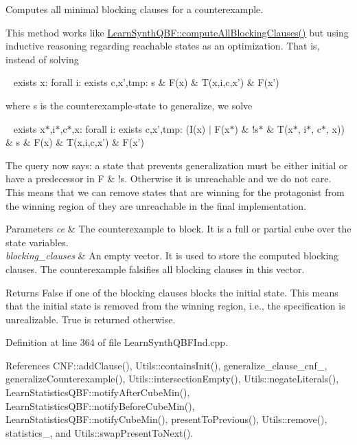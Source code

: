 Computes all minimal blocking clauses for a counterexample. 

This method works like \hyperlink{classLearnSynthQBF_affa7b4583cc17d01f4c82fd57e763e1f}{Learn\-Synth\-Q\-B\-F\-::compute\-All\-Blocking\-Clauses()} but using inductive reasoning regarding reachable states as an optimization. That is, instead of solving \par
 ~ exists x\-: forall i\-: exists c,x',tmp\-: s \& F(x) \& T(x,i,c,x') \& F(x') \par
 where s is the counterexample-\/state to generalize, we solve \par
 ~ exists x$\ast$,i$\ast$,c$\ast$,x\-: forall i\-: exists c,x',tmp\-: (I(x) $|$ F(x$\ast$) \& !s$\ast$ \& T(x$\ast$, i$\ast$, c$\ast$, x)) \& s \& F(x) \& T(x,i,c,x') \& F(x') \par
 The query now says\-: a state that prevents generalization must be either initial or have a predecessor in F \& !s. Otherwise it is unreachable and we do not care. This means that we can remove states that are winning for the protagonist from the winning region of they are unreachable in the final implementation.


\begin{DoxyParams}{Parameters}
{\em ce} & The counterexample to block. It is a full or partial cube over the state variables. \\
\hline
{\em blocking\-\_\-clauses} & An empty vector. It is used to store the computed blocking clauses. The counterexample falsifies all blocking clauses in this vector. \\
\hline
\end{DoxyParams}
\begin{DoxyReturn}{Returns}
False if one of the blocking clauses blocks the initial state. This means that the initial state is removed from the winning region, i.\-e., the specification is unrealizable. True is returned otherwise. 
\end{DoxyReturn}


Definition at line 364 of file Learn\-Synth\-Q\-B\-F\-Ind.\-cpp.



References C\-N\-F\-::add\-Clause(), Utils\-::contains\-Init(), generalize\-\_\-clause\-\_\-cnf\-\_\-, generalize\-Counterexample(), Utils\-::intersection\-Empty(), Utils\-::negate\-Literals(), Learn\-Statistics\-Q\-B\-F\-::notify\-After\-Cube\-Min(), Learn\-Statistics\-Q\-B\-F\-::notify\-Before\-Cube\-Min(), Learn\-Statistics\-Q\-B\-F\-::notify\-Cube\-Min(), present\-To\-Previous(), Utils\-::remove(), statistics\-\_\-, and Utils\-::swap\-Present\-To\-Next().




